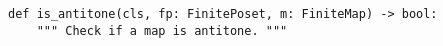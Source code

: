 \begin{verbatim}
def is_antitone(cls, fp: FinitePoset, m: FiniteMap) -> bool:
    """ Check if a map is antitone. """
\end{verbatim}